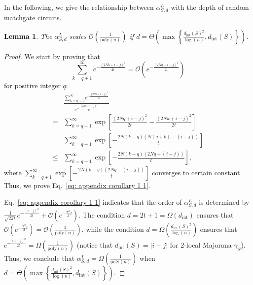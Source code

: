 \documentclass[journal=jctcce,a4paper,manuscript=article]{achemso}
\newtheorem{lemma}{Lemma}
\begin{document}
In the following, we give the relationship between $\alpha_{S,d}^L$ with the
depth of random matchgate circuits.
\begin{lemma}
  \label{corollary: 1}
  The $\alpha_{S,d}^L$ scales $\mathcal{O}\left( \frac{1}{\mathrm{poly}(n)}\right)$ if $d = \Theta\left(\max\left\{ \frac{d_{\text{int}}(S)^2}{\log(n)} , d_{\text{int}}(S)\right\}\right)$.
\end{lemma}
\begin{proof}
  We start by proving that
  \begin{equation}
    \label{eq: appendix corollary 1 1}
    \sum_{k=q+1}^{\infty} e^{-\frac{(2Nk+i-j)^2}{2t}}  = \mathcal{O}\left(e^{-\frac{(2Nq+i-j)^2}{2t}}\right)
  \end{equation}
  for positive integer $q$:
  \begin{align}
         & \frac{\sum_{k=q+1}^{\infty} e^{-\frac{(2Nk+i-j)^2}{2t}}}{e^{-\frac{(2Nq+i-j)^2}{2t}}} \\
    =    & \sum_{k=q+1}^{\infty} \exp\left[\frac{(2Nq+i-j)^2}{2t}-\frac{(2Nk+i-j)^2}{2t} \right] \\
    =    & \sum_{k=q+1}^{\infty} \exp\left[-\frac{2N(k-q)(N(q+k) -(i-j))}{t}\right]              \\
    \leq & \sum_{k=q+1}^{\infty} \exp\left[-\frac{2N(k-q)(2Nq -(i-j))}{t}\right],
  \end{align}
  where $\sum_{k=q+1}^{\infty} \exp\left[-\frac{2N(k-q)(2Nq -(i-j))}{t}\right]$ converges to certain constant. Thus, we prove Eq.~\eqref{eq: appendix corollary 1 1}.

  Eq.~\eqref{eq: appendix corollary 1 1} indicates that the order of
  $\alpha_{S,d}^L$ is determined by $\frac{1}{\sqrt{2\pi t}}
    e^{-\frac{(i-j)^2}{2t}}+\mathcal{O}\left(e^{-\frac{\pi^2}{2}t}\right).$ The
  condition $d = 2t+1 = \Omega(d_{\text{int}})$ ensures that
  $\mathcal{O}\left(e^{-\frac{\pi^2}{2}t}\right)
    =\mathcal{O}\left(\frac{1}{\mathrm{poly}(n)}\right) $, while the condition $d =
    \Omega(\frac{d_{\text{int}}(S)^2}{\log(n)} )$ ensures that
  $e^{-\frac{(i-j)^2}{2t}} =\Omega\left(\frac{1}{\mathrm{poly}(n)}\right) $
  (notice that $d_\text{int}(S) = |i-j|$ for 2-local Majorana $\gamma_S$). Thus,
  we conclude that $\alpha_{S,d}^L = \Omega\left(
    \frac{1}{\mathrm{poly}(n)}\right)$ when $d = \Theta\left(\max\left\{
    \frac{d_{\text{int}}(S)^2}{\log(n)} , d_{\text{int}}(S)\right\}\right)$.

\end{proof}
\end{document}
